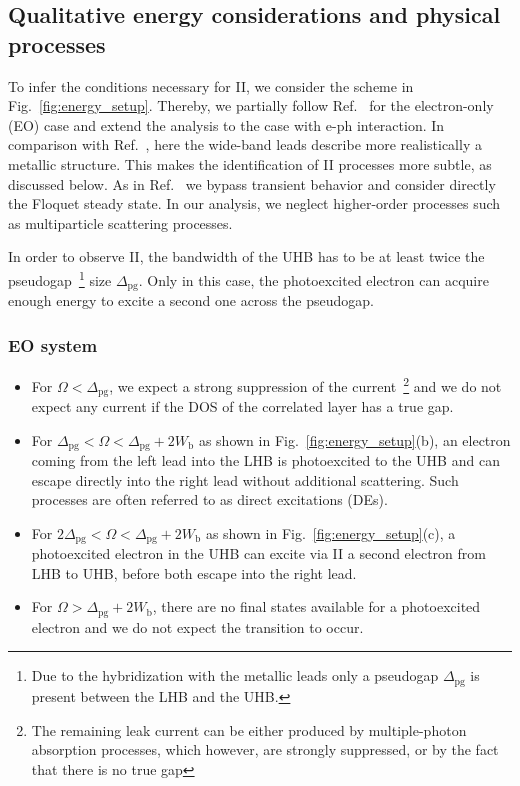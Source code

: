 \documentclass[aps,prb,groupedaddress,showpacs,twocolumn,superscriptaddress,10pt]{revtex4-2}
\begin{document}
\subsection{Qualitative energy considerations and physical processes}
\label{sec:explicative_scheme}
 
To infer the conditions necessary for II, we consider the  scheme in Fig.~\ref{fig:energy_setup}. Thereby, we partially follow Ref.~\cite{so.do.18} for the electron-only (EO) case and extend the analysis to the case with e-ph interaction.
In comparison with Ref.~\cite{so.do.18}, here the wide-band leads describe more realistically a metallic structure. This makes the identification of II processes more subtle, as discussed below.
As in Ref.~\cite{so.do.18} we bypass transient behavior and consider directly the Floquet steady state. In our analysis, we neglect higher-order processes such as multiparticle scattering processes. 

In order to observe II, the bandwidth of the UHB has to be at least twice the pseudogap~\footnote{Due to the hybridization with the metallic leads 
only a pseudogap $\Delta_{\text{pg}}$ is present between the LHB and the UHB.} size $\Delta_{\text{pg}}$. Only in this case, the photoexcited electron can acquire enough energy to excite a second one across the pseudogap. 
 

\subsubsection{EO system}
\label{sec:scheme_only_electrons}  
 
\begin{itemize}
\item For $\Omega<\Delta_{\text{pg}}$, 
we expect a strong suppression of the current~\footnote{The remaining leak current can be either produced by multiple-photon absorption processes, which however, are strongly suppressed, or by the fact that there is no true gap} and
we do not expect any current if the DOS of the correlated layer has a true gap.
\item For $\Delta_{\text{pg}}<\Omega<\Delta_{\text{pg}}+2W_{\text{b}}$ as shown in Fig.~\ref{fig:energy_setup}(b), an electron coming from the left lead into the LHB is photoexcited to the UHB and can escape directly into the right lead without additional scattering.  Such processes are often referred to as direct excitations (DEs).
\item For $2\Delta_{\text{pg}}<\Omega<\Delta_{\text{pg}}+2W_{\text{b}}$ as shown in Fig.~\ref{fig:energy_setup}(c), a photoexcited electron in the UHB can excite via II a second electron from LHB to UHB, before both escape into the right lead.
\item For $\Omega>\Delta_{\text{pg}}+2W_{\text{b}}$, there are no final states available for a photoexcited electron and we do not expect the transition to occur. 
\end{itemize}
\end{document}
